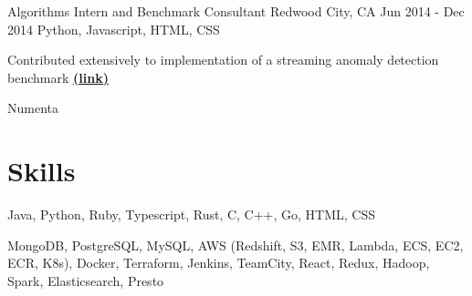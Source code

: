 \documentclass[letterpaper]{simjega-resume}
\begin{document}
{Algorithms Intern and Benchmark Consultant}
{Redwood City, CA}
{Jun 2014 - Dec 2014}
{Python, Javascript, HTML, CSS}
{\begin{tightitemize}
\item[] Contributed extensively to implementation of a streaming anomaly detection benchmark
\href{https://github.com/Numenta/NAB}{\bf (link)}
\end{tightitemize}}
{Numenta}






\section{Skills}
\jgsectionline

{
Java,
Python,
Ruby,
Typescript,
Rust,
C,
C++,
Go,
HTML,
CSS
}

{
MongoDB,
PostgreSQL,
MySQL,
AWS (Redshift, S3, EMR, Lambda, ECS, EC2, ECR, K8s),
Docker,
Terraform,
Jenkins,
TeamCity,
React,
Redux,
Hadoop,
Spark,
Elasticsearch,
Presto

}
\end{document}

